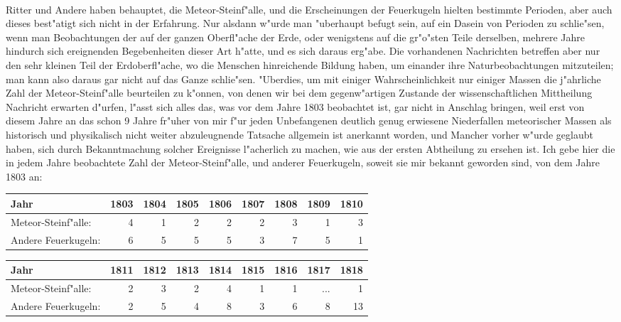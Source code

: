 \documentclass[a4paper, 11pt, oneside, polutonikogreek, german]{article}
\begin{document}
\paragraph{}
Ritter und Andere haben behauptet, die Meteor-Steinf"alle, und die Erscheinungen der Feuerkugeln hielten bestimmte Perioden, aber auch dieses best"atigt sich nicht in der Erfahrung. Nur alsdann w"urde man "uberhaupt befugt sein, auf ein Dasein von Perioden zu schlie"sen, wenn man Beobachtungen der auf der ganzen Oberfl"ache der Erde, oder wenigstens auf die gr"o"sten Teile derselben, mehrere Jahre hindurch sich ereignenden Begebenheiten dieser Art h"atte, und es sich daraus erg"abe. Die vorhandenen Nachrichten betreffen aber nur den sehr kleinen Teil der Erdoberfl"ache, wo die Menschen hinreichende Bildung haben, um einander ihre Naturbeobachtungen mitzuteilen; man kann also daraus gar nicht auf das Ganze schlie"sen. "Uberdies, um mit einiger Wahrscheinlichkeit nur einiger Massen die j"ahrliche Zahl der Meteor-Steinf"alle beurteilen zu k"onnen, von denen wir bei dem gegenw"artigen Zustande der wissenschaftlichen Mittheilung Nachricht erwarten d"urfen, l"asst sich alles das, was vor dem Jahre 1803 beobachtet ist, gar nicht in Anschlag bringen, weil erst von diesem Jahre an das schon 9 Jahre fr"uher von mir f"ur jeden Unbefangenen deutlich genug erwiesene Niederfallen meteorischer Massen als historisch und physikalisch nicht weiter abzuleugnende Tatsache allgemein ist anerkannt worden, und Mancher vorher w"urde geglaubt haben, sich durch Bekanntmachung solcher Ereignisse l"acherlich zu machen, wie aus der ersten Abtheilung zu ersehen ist. Ich gebe hier die in jedem Jahre beobachtete Zahl der Meteor-Steinf"alle, und anderer Feuerkugeln, soweit sie mir bekannt geworden sind, von dem Jahre 1803 an:
\begin{center}
    \footnotesize
    \begin{tabular}{ |l|r|r|r|r|r|r|r|r| } 
    \hline
    Jahr & 1803 & 1804 & 1805 & 1806 & 1807 & 1808 & 1809 & 1810\\\hline
    Meteor-Steinf"alle: & 4 & 1 & 2 & 2 & 2 & 3 & 1 & 3\\\hline
    Andere Feuerkugeln: & 6 & 5 & 5 & 5 & 3 & 7 & 5 & 1\\
    \hline
    \end{tabular}
\end{center}
\begin{center}
    \footnotesize
    \begin{tabular}{ |l|r|r|r|r|r|r|r|r| } 
    \hline
    Jahr & 1811 & 1812 & 1813 & 1814 & 1815 & 1816 & 1817 & 1818\\\hline
    Meteor-Steinf"alle: & 2 & 3 & 2 & 4 & 1 & 1 & ... & 1\\\hline
    Andere Feuerkugeln: & 2 & 5 & 4 & 8 & 3 & 6 & 8 & 13\\
    \hline
    \end{tabular}
\end{center}
\end{document}
